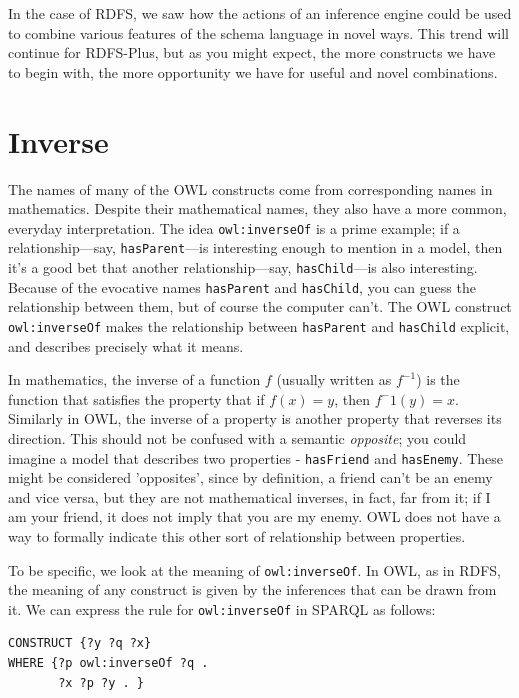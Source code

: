 In the case of RDFS, we saw how the actions of an inference engine could
be used to combine various features of the schema language in novel
ways. This trend will continue for RDFS-Plus, but as you might expect,
the more constructs we have to begin with, the more opportunity we have
for useful and novel combinations.

\section{Inverse}

The names of many of the OWL constructs come from corresponding names in
mathematics. Despite their mathematical names, they also have a more
common, everyday interpretation. The idea \texttt{owl:inverseOf} is a prime
example; if a relationship---say, \texttt{hasParent}---is interesting enough to
mention in a model, then it's a good bet that another
relationship---say, \texttt{hasChild}---is also interesting. Because of the
evocative names \texttt{hasParent} and \texttt{hasChild}, you can guess the relationship
between them, but of course the computer can't. The OWL construct
\texttt{owl:inverseOf} makes the relationship between \texttt{hasParent} and \texttt{hasChild}
explicit, and describes precisely what it means.

In mathematics, the inverse of a function $f$ (usually written as $f^{-1}$) is
the function that satisfies the
property that if $f(x) = y$, then $f^-1(y) = x$. Similarly in OWL, the
inverse of a property is another property that reverses its direction.  This should not be confused with 
a semantic \textit{opposite};  you could imagine a model that describes two 
properties - \texttt{hasFriend} and \texttt{hasEnemy}.  These might be considered 'opposites', since 
by definition, a friend can't be an enemy and vice versa, but they are not mathematical inverses, in fact, far from it;
if I am your friend, it does not imply that you are my enemy.  OWL does not have a way to formally indicate this other sort of 
relationship between properties. 

To be specific, we look at the meaning of \texttt{owl:inverseOf}. In OWL, as in
RDFS, the meaning of any construct is given by the inferences that can
be drawn from it. We can express the rule for \texttt{owl:inverseOf} in SPARQL as
follows:

\begin{lstlisting}
CONSTRUCT {?y ?q ?x}
WHERE {?p owl:inverseOf ?q .
       ?x ?p ?y . }
\end{lstlisting}

